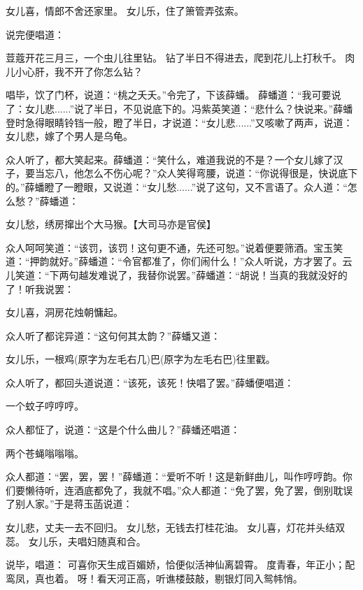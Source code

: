 \documentclass[12pt,oneside]{book}
\begin{document}
女儿喜，情郎不舍还家里。
女儿乐，住了箫管弄弦索。

说完便唱道：

荳蔻开花三月三，一个虫儿往里钻。
钻了半日不得进去，爬到花儿上打秋千。
肉儿小心肝，我不开了你怎么钻？

唱毕，饮了门杯，说道：“桃之夭夭。”令完了，下该薛蟠。
薛蟠道：“我可要说了：女儿悲......”说了半日，不见说底下的。冯紫英笑道：“悲什么？快说来。”薛蟠登时急得眼睛铃铛一般，瞪了半日，才说道：“女儿悲......”又咳嗽了两声，说道：
女儿悲，嫁了个男人是乌龟。

众人听了，都大笑起来。薛蟠道：“笑什么，难道我说的不是？一个女儿嫁了汉子，要当忘八，他怎么不伤心呢？”众人笑得弯腰，说道：“你说得很是，快说底下的。”薛蟠瞪了一瞪眼，又说道：“女儿愁......”说了这句，又不言语了。众人道：“怎么愁？”薛蟠道：

女儿愁，绣房撺出个大马猴。【大司马亦是官侯】

众人呵呵笑道：“该罚，该罚！这句更不通，先还可恕。”说着便要筛酒。宝玉笑道：“押韵就好。”薛蟠道：“令官都准了，你们闹什么！”众人听说，方才罢了。云儿笑道：“下两句越发难说了，我替你说罢。”薛蟠道：“胡说！当真的我就没好的了！听我说罢：

女儿喜，洞房花烛朝慵起。

众人听了都诧异道：“这句何其太韵？”薛蟠又道：

女儿乐，一根鸡(原字为左毛右几)巴(原字为左毛右巴)往里戳。

众人听了，都回头道说道：“该死，该死！快唱了罢。”薛蟠便唱道：

一个蚊子哼哼哼。

众人都怔了，说道：“这是个什么曲儿？”薛蟠还唱道：

两个苍蝇嗡嗡嗡。

众人都道：“罢，罢，罢！”薛蟠道：“爱听不听！这是新鲜曲儿，叫作哼哼韵。你们要懒待听，连酒底都免了，我就不唱。”众人都道：“免了罢，免了罢，倒别耽误了别人家。”于是蒋玉菡说道：

女儿悲，丈夫一去不回归。
女儿愁，无钱去打桂花油。
女儿喜，灯花并头结双蕊。
女儿乐，夫唱妇随真和合。

说毕，唱道：
可喜你天生成百媚娇，恰便似活神仙离碧霄。
度青春，年正小；配鸾凤，真也着。
呀！看天河正高，听谯楼鼓敲，剔银灯同入鸳帏悄。
\end{document}
